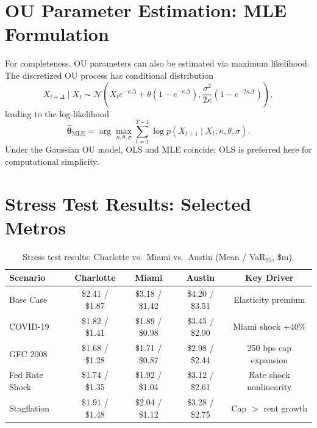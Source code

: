 \documentclass[11pt,letterpaper]{article}
\begin{document}
\section{OU Parameter Estimation: MLE Formulation}
\label{app:ou_mle}

For completeness, OU parameters can also be estimated via maximum likelihood. The
discretized OU process has conditional distribution
\begin{equation}
X_{t+\Delta} \mid X_t \sim \mathcal{N}\!\left(
X_t e^{-\kappa\Delta} + \theta(1-e^{-\kappa\Delta}),
\frac{\sigma^2}{2\kappa}(1-e^{-2\kappa\Delta})
\right),
\label{eq:ou_mle}
\end{equation}
leading to the log-likelihood
\begin{equation}
\hat{\boldsymbol{\theta}}_{\text{MLE}}
= \arg\max_{\kappa,\theta,\sigma}
\sum_{t=1}^{T-1} \log p(X_{t+1}\mid X_t;\kappa,\theta,\sigma).
\label{eq:mle}
\end{equation}
Under the Gaussian OU model, OLS and MLE coincide; OLS is preferred here for computational
simplicity.

\section{Stress Test Results: Selected Metros}
\label{app:stress}

\begin{table}[H]
\centering
\caption{Stress test results: Charlotte vs.\ Miami vs.\ Austin (Mean / VaR$_{95}$, \$m).}
\label{tab:stress}
\begin{tabular}{lcccc}
\toprule
\textbf{Scenario} & \textbf{Charlotte} & \textbf{Miami} & \textbf{Austin} & \textbf{Key Driver} \\
\midrule
Base Case      & \$2.41 / \$1.87 & \$3.18 / \$1.42 & \$4.20 / \$3.51 & Elasticity premium \\
COVID-19       & \$1.82 / \$1.41 & \$1.89 / \$0.98 & \$3.45 / \$2.90 & Miami shock $+40$\% \\
GFC 2008       & \$1.68 / \$1.28 & \$1.71 / \$0.87 & \$2.98 / \$2.44 & 250 bps cap expansion \\
Fed Rate Shock & \$1.74 / \$1.35 & \$1.92 / \$1.04 & \$3.12 / \$2.61 & Rate shock nonlinearity \\
Stagflation    & \$1.91 / \$1.48 & \$2.04 / \$1.12 & \$3.28 / \$2.75 & Cap $>$ rent growth \\
\bottomrule
\end{tabular}
\end{table}
\end{document}
